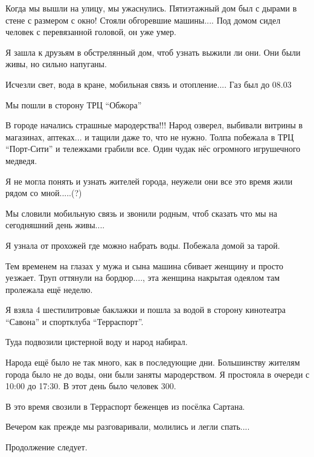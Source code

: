 Когда мы вышли на улицу, мы ужаснулись. Пятиэтажный дом был с дырами в стене с
размером с окно!  Стояли обгоревшие машины.... Под домом сидел человек с
перевязанной головой, он уже умер.  

Я зашла к друзьям в обстрелянный дом, чтоб узнать выжили ли они. Они были живы,
но сильно напуганы. 

Исчезли свет, вода в кране, мобильная связь и отопление.... Газ был до 08.03

Мы пошли в сторону ТРЦ \enquote{Обжора}

В городе начались страшные мародерства!!! Народ озверел, выбивали витрины в
магазинах, аптеках... и тащили даже то, что не нужно. Толпа побежала в ТРЦ
\enquote{Порт-Сити} и тележками грабили все. Один чудак нёс огромного игрушечного
медведя. 

Я не могла понять и узнать жителей города, неужели они все это время жили рядом
со мной.....(?)

Мы словили мобильную связь и звонили родным, чтоб сказать что мы на сегодняшний
день живы....

Я узнала от прохожей где можно набрать воды. Побежала домой за тарой. 

Тем временем на глазах у мужа и сына машина сбивает женщину и просто уезжает.
Труп оттянули на бордюр...., эта женщина накрытая одеялом там пролежала ещё
неделю. 

Я взяла 4 шестилитровые баклажки и пошла за водой в сторону кинотеатра \enquote{Савона}
и спортклуба \enquote{Терраспорт}. 

Туда подвозили цистерной воду и народ набирал. 

Народа ещё было не так много, как в последующие дни. Большинству жителям города
было не до воды, они были заняты мародерством. Я простояла в очереди с 10:00 до
17:30. В этот день было человек 300.

В это время свозили в Терраспорт беженцев из посёлка Сартана. 

Вечером как прежде мы разговаривали, молились и легли спать....

Продолжение следует.

